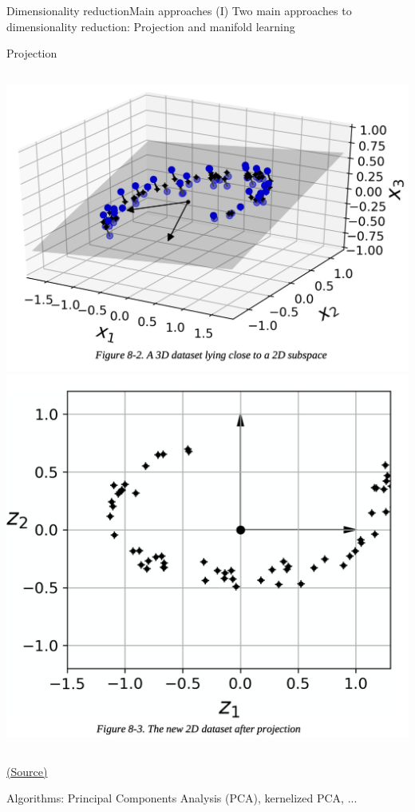 \documentclass[10pt,compress]{beamer} %
\begin{document}
\begin{frame}{Dimensionality reduction}{Main approaches (I)}
	Two main approaches to dimensionality reduction: Projection and \alert{manifold learning}

    \bigskip

    \centering Projection
    \begin{columns}
	    \includegraphics[width=\textwidth]{figs/subspace_projection.png} 
	    \includegraphics[width=\textwidth]{figs/2d_projection.png} 
    \end{columns}
	\scriptsize\href{https://github.com/Akramz/Hands-on-Machine-Learning-with-Scikit-Learn-Keras-and-TensorFlow/blob/master/08.Dim_Reduction.ipynb}{(Source)}

    \normalsize
    \flushleft
    Algorithms: Principal Components Analysis (PCA), kernelized PCA, ...
\end{frame}
\end{document}
